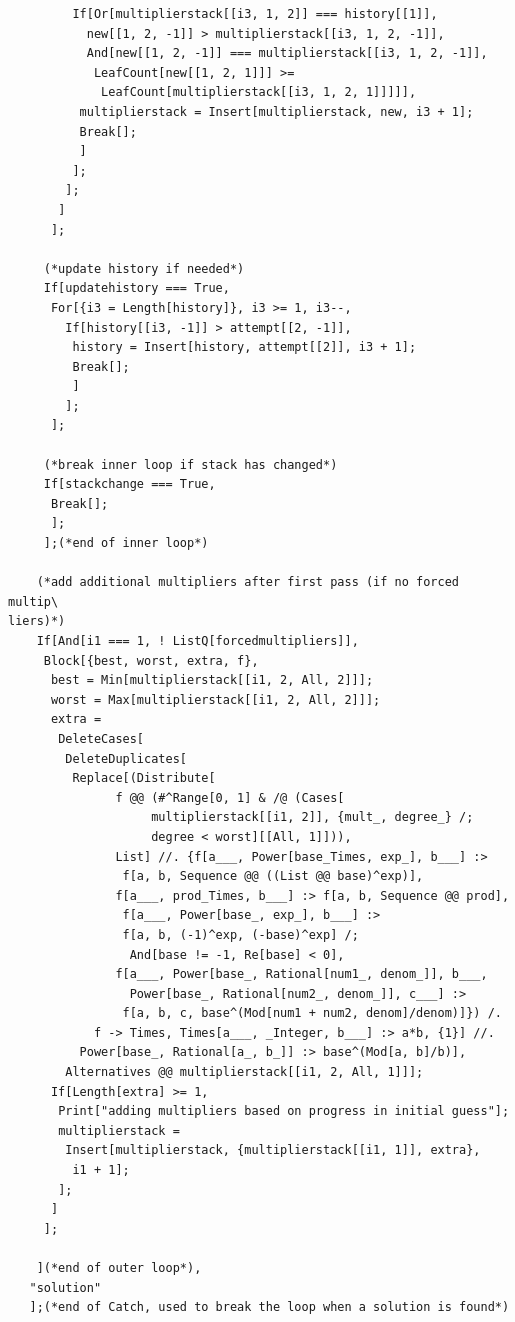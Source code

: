 \documentclass[11pt,letterpaper]{article}
\theoremstyle{definition}
\theoremstyle{remark}
\begin{document}
\begin{lstlisting}
         If[Or[multiplierstack[[i3, 1, 2]] === history[[1]], 
           new[[1, 2, -1]] > multiplierstack[[i3, 1, 2, -1]], 
           And[new[[1, 2, -1]] === multiplierstack[[i3, 1, 2, -1]], 
            LeafCount[new[[1, 2, 1]]] >= 
             LeafCount[multiplierstack[[i3, 1, 2, 1]]]]],
          multiplierstack = Insert[multiplierstack, new, i3 + 1];
          Break[];
          ]
         ];
        ];
       ]
      ];
     
     (*update history if needed*)
     If[updatehistory === True,
      For[{i3 = Length[history]}, i3 >= 1, i3--,
        If[history[[i3, -1]] > attempt[[2, -1]],
         history = Insert[history, attempt[[2]], i3 + 1];
         Break[];
         ]
        ];
      ];
     
     (*break inner loop if stack has changed*)
     If[stackchange === True,
      Break[];
      ];
     ];(*end of inner loop*)
    
    (*add additional multipliers after first pass (if no forced multip\
liers)*)
    If[And[i1 === 1, ! ListQ[forcedmultipliers]],
     Block[{best, worst, extra, f},
      best = Min[multiplierstack[[i1, 2, All, 2]]];
      worst = Max[multiplierstack[[i1, 2, All, 2]]];
      extra = 
       DeleteCases[
        DeleteDuplicates[
         Replace[(Distribute[
               f @@ (#^Range[0, 1] & /@ (Cases[
                    multiplierstack[[i1, 2]], {mult_, degree_} /; 
                    degree < worst][[All, 1]])), 
               List] //. {f[a___, Power[base_Times, exp_], b___] :> 
                f[a, b, Sequence @@ ((List @@ base)^exp)], 
               f[a___, prod_Times, b___] :> f[a, b, Sequence @@ prod],
                f[a___, Power[base_, exp_], b___] :> 
                f[a, b, (-1)^exp, (-base)^exp] /; 
                 And[base != -1, Re[base] < 0], 
               f[a___, Power[base_, Rational[num1_, denom_]], b___, 
                 Power[base_, Rational[num2_, denom_]], c___] :> 
                f[a, b, c, base^(Mod[num1 + num2, denom]/denom)]}) /. 
            f -> Times, Times[a___, _Integer, b___] :> a*b, {1}] //. 
          Power[base_, Rational[a_, b_]] :> base^(Mod[a, b]/b)], 
        Alternatives @@ multiplierstack[[i1, 2, All, 1]]];
      If[Length[extra] >= 1,
       Print["adding multipliers based on progress in initial guess"];
       multiplierstack = 
        Insert[multiplierstack, {multiplierstack[[i1, 1]], extra}, 
         i1 + 1];
       ];
      ]
     ];
    
    ](*end of outer loop*),
   "solution"
   ];(*end of Catch, used to break the loop when a solution is found*)
  

\end{lstlisting}
\end{document}
